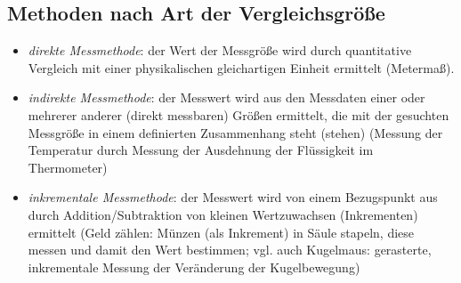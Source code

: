 \subsection{Methoden nach Art der Vergleichsgröße}
\begin{itemize}
\item \emph{direkte Messmethode}: der Wert der Messgröße wird durch quantitative Vergleich mit einer physikalischen gleichartigen Einheit ermittelt (Metermaß).
\item \emph{indirekte Messmethode}: der Messwert wird aus den Messdaten einer oder mehrerer anderer (direkt messbaren) Größen ermittelt, die mit der gesuchten Messgröße in einem definierten Zusammenhang steht (stehen) (Messung der Temperatur durch Messung der Ausdehnung der Flüssigkeit im Thermometer)
\item \emph{inkrementale Messmethode}: der Messwert wird von einem Bezugspunkt aus durch Addition/Subtraktion von kleinen Wertzuwachsen (Inkrementen) ermittelt (Geld zählen: Münzen (als Inkrement) in Säule stapeln, diese messen und damit den Wert bestimmen; vgl. auch Kugelmaus: gerasterte, inkrementale Messung der Veränderung der Kugelbewegung)
\end{itemize}

